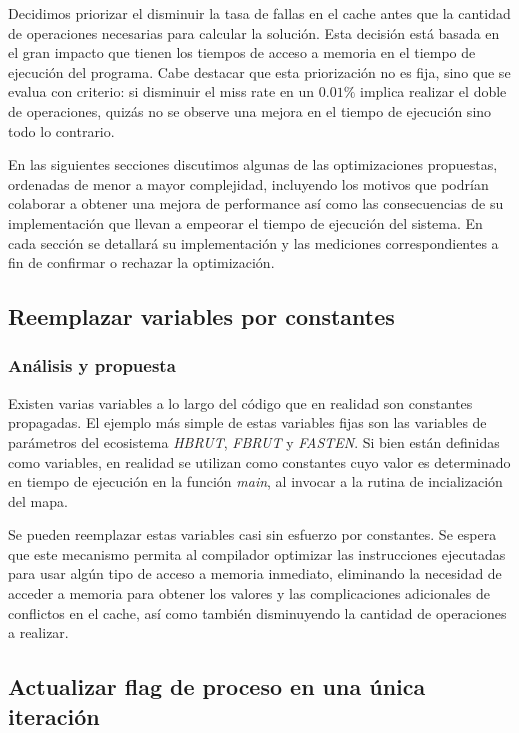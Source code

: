 \documentclass[a4paper,11pt]{article}
\begin{document}
Decidimos priorizar el disminuir la tasa de fallas en el cache antes que la
cantidad de operaciones necesarias para calcular la solución. Esta decisión
está basada en el gran impacto que tienen los tiempos de acceso a memoria en el
tiempo de ejecución del programa. Cabe destacar que esta priorización no es
fija, sino que se evalua con criterio: si disminuir el miss rate en un
\(0.01\%\) implica realizar el doble de operaciones, quizás no se observe una
mejora en el tiempo de ejecución sino todo lo contrario.

En las siguientes secciones discutimos algunas de las optimizaciones
propuestas, ordenadas de menor a mayor complejidad, incluyendo los motivos que
podrían colaborar a obtener una mejora de performance así como las
consecuencias de su implementación que llevan a empeorar el tiempo de ejecución
del sistema. En cada sección se detallará su implementación y las mediciones
correspondientes a fin de confirmar o rechazar la optimización.

\subsection{Reemplazar variables por constantes}

\subsubsection{Análisis y propuesta}

Existen varias variables a lo largo del código que en realidad son constantes
propagadas. El ejemplo más simple de estas variables fijas son las variables de
parámetros del ecosistema \textit{HBRUT}, \textit{FBRUT} y \textit{FASTEN}. Si
bien están definidas como variables, en realidad se utilizan como constantes
cuyo valor es determinado en tiempo de ejecución en la función \textit{main},
al invocar a la rutina de incialización del mapa.

Se pueden reemplazar estas variables casi sin esfuerzo por constantes. Se
espera que este mecanismo permita al compilador optimizar las instrucciones
ejecutadas para usar algún tipo de acceso a memoria inmediato, eliminando la
necesidad de acceder a memoria para obtener los valores y las complicaciones
adicionales de conflictos en el cache, así como también disminuyendo la
cantidad de operaciones a realizar.

\subsection{Actualizar flag de proceso en una única iteración}
\end{document}
